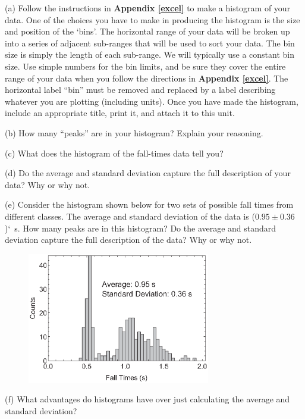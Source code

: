 (a) Follow the instructions in \textbf{Appendix \ref{excel}} to make a histogram of your data. 
One of the choices you have to make in producing the histogram is the size and position of the `bins'.
The horizontal range of your data will be broken up into a series of adjacent sub-ranges that will be used to sort your data. The bin size is simply the length of each sub-range. 
We will typically use a constant bin size.
Use simple numbers for the bin limits, and be sure they cover the entire range of your data when you follow the directions in \textbf{Appendix \ref{excel}}.  The horizontal label ``bin'' must be removed and replaced by a label describing whatever you are plotting (including units).
Once you have made the histogram, include an appropriate title, print it, and attach it to this unit.
\vspace{2mm}

(b) How many ``peaks'' are in your histogram? Explain your reasoning.
\answerspace{10mm}

(c) What does the histogram of the fall-times data tell you?
\answerspace{15mm}

(d) Do the average and standard deviation capture the full description of your data? Why or why not.
\answerspace{15mm}

(e) Consider the histogram shown below for two sets of possible fall times from different classes. 
The average and standard deviation of the data is ($0.95\pm 0.36$)`~s. How many peaks are in this
histogram? Do the average and standard deviation capture the full description of the data? Why or why not.

\begin{figure}[hb]
\includegraphics[height=2.25in]{measurement_uncertainty/histogram_gray.eps}\label{SampleHist1}
\end{figure}

(f) What advantages do histograms have over just calculating the average and standard deviation?
\answerspace{20mm}

